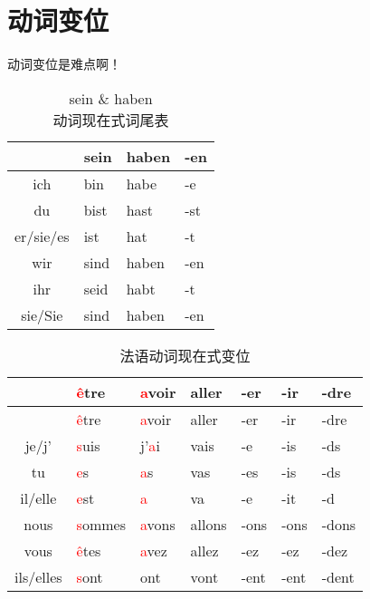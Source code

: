 \documentclass[12pt,A4paper,oneside,reqno]{amsart}
\numberwithin{equation}{section}
\theoremstyle{plain}
\theoremstyle{plain}
\theoremstyle{plain}
\numberwithin{equation}{section}
\theoremstyle{remark}
\begin{document}
\section{动词变位}
动词变位是难点啊！
\begin{table}[th]
	\begin{minipage}[t]{0.48\textwidth}
		\centering
		\begin{tabular}{c|l|l|l}
			\hline							
	&	sein	&	haben	&	-en	\\
\hline							
ich	&	bin	&	habe	&	-e	\\
du	&	bist	&	ha\phantom{b}st	&	-st	\\
er/sie/es	&	\phantom{b}ist	&	ha\phantom{b}t	&	-t	\\
wir	&	sind	&	haben	&	-en	\\
ihr	&	seid	&	habt	&	-t	\\
sie/Sie	&	sind	&	haben	&	-en	\\



			
			\hline									
			
		\end{tabular}
		\vspace{0.5cm}
		\caption{sein \& haben\protect\\
		\indent\hspace{1.3cm}动词现在式词尾表}
		\label{fig:Fa:be&have}
	\end{minipage}
\end{table}
	\begin{longtable}{c|l|l|l|l|l|l}
	\hline
	&	\textcolor{red}{\^{e}}tre	&	\textcolor{red}{a}voir	&	aller	&	-er	&	-ir	&	-dre	\\
	\hline
	\endhead
	\hline
	&	\textcolor{red}{\^{e}}tre	&	\textcolor{red}{a}voir	&	aller	&	-er	&	-ir	&	-dre	\\
	\hline
	\endfirsthead	
	\hline
	\endfoot
	\hline		
		\caption{法语动词现在式变位}
	\endlastfoot
je/j'	&	\textcolor{red}{s}uis	&	j'\textcolor{red}{a}i	&	vais	&	-e	&	-is	&	-ds	\\
tu	&	\textcolor{red}{e}s	&	\phantom{j'}\textcolor{red}{a}s	&	vas	&	-es	&	-is	&	-ds	\\
il/elle	&	\textcolor{red}{e}st	&	\phantom{j'}\textcolor{red}{a}	&	va	&	-e	&	-it	&	-d	\\
nous	&	\textcolor{red}{s}ommes	&	\phantom{j'}\textcolor{red}{a}vons	&	allons	&	-ons	&	-ons	&	-dons	\\
vous	&	\textcolor{red}{\^{e}}tes	&	\phantom{j'}\textcolor{red}{a}vez	&	allez	&	-ez	&	-ez	&	-dez	\\
ils/elles	&	\textcolor{red}{s}ont	&	\phantom{j'a}ont	&	vont	&	-ent	&	-ent	&	-dent	\\

		
			\hline								
			\end{longtable}
\end{document}
